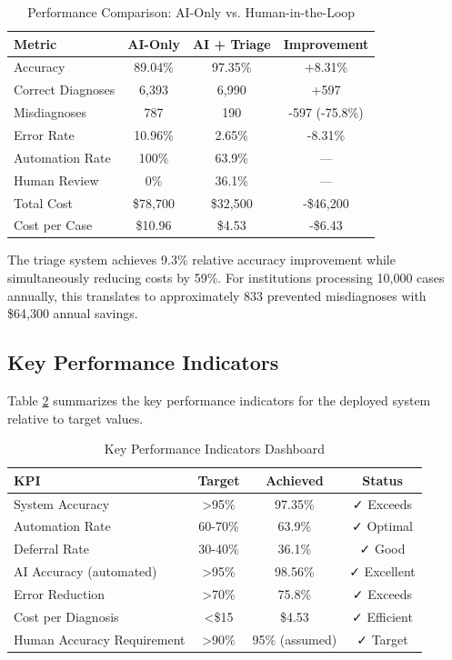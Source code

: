 \documentclass[10pt,a4paper]{article}
\begin{document}
\begin{table}[h]
\centering
\caption{Performance Comparison: AI-Only vs. Human-in-the-Loop}
\label{tab:ai_vs_hitl}
\begin{tabular}{lccc}
\toprule
\textbf{Metric} & \textbf{AI-Only} & \textbf{AI + Triage} & \textbf{Improvement} \\
\midrule
Accuracy & 89.04\% & 97.35\% & +8.31\% \\
Correct Diagnoses & 6,393 & 6,990 & +597 \\
Misdiagnoses & 787 & 190 & -597 (-75.8\%) \\
Error Rate & 10.96\% & 2.65\% & -8.31\% \\
Automation Rate & 100\% & 63.9\% & --- \\
Human Review & 0\% & 36.1\% & --- \\
Total Cost & \$78,700 & \$32,500 & -\$46,200 \\
Cost per Case & \$10.96 & \$4.53 & -\$6.43 \\
\bottomrule
\end{tabular}
\end{table}

The triage system achieves 9.3\% relative accuracy improvement while simultaneously reducing costs by 59\%. For institutions processing 10,000 cases annually, this translates to approximately 833 prevented misdiagnoses with \$64,300 annual savings.

\subsection{Key Performance Indicators}

Table \ref{tab:kpi_dashboard} summarizes the key performance indicators for the deployed system relative to target values.

\begin{table}[h]
\centering
\caption{Key Performance Indicators Dashboard}
\label{tab:kpi_dashboard}
\begin{tabular}{lccc}
\toprule
\textbf{KPI} & \textbf{Target} & \textbf{Achieved} & \textbf{Status} \\
\midrule
System Accuracy & >95\% & 97.35\% & ✓ Exceeds \\
Automation Rate & 60-70\% & 63.9\% & ✓ Optimal \\
Deferral Rate & 30-40\% & 36.1\% & ✓ Good \\
AI Accuracy (automated) & >95\% & 98.56\% & ✓ Excellent \\
Error Reduction & >70\% & 75.8\% & ✓ Exceeds \\
Cost per Diagnosis & <\$15 & \$4.53 & ✓ Efficient \\
Human Accuracy Requirement & >90\% & 95\% (assumed) & ✓ Target \\
\bottomrule
\end{tabular}
\end{table}
\end{document}
